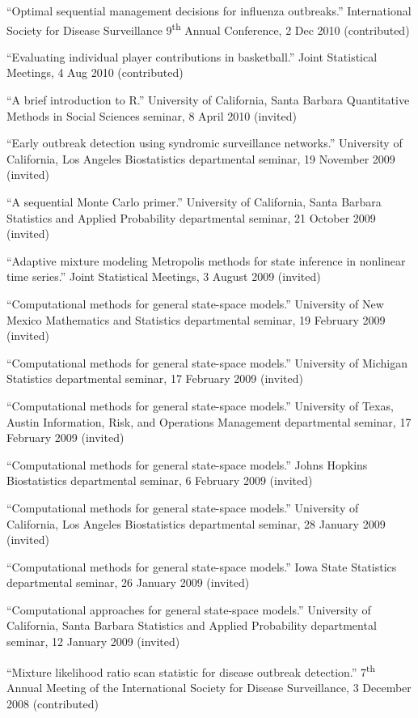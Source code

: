 \documentclass[overlapped,line,letterpaper]{res}
\begin{document}
\begin{resume}
{``Optimal sequential management decisions for influenza outbreaks.'' International Society for Disease Surveillance 9\textsuperscript{th} Annual Conference, 2 Dec 2010 (contributed)

``Evaluating individual player contributions in basketball.'' Joint Statistical Meetings, 4 Aug 2010 (contributed)

``A brief introduction to R.'' University of California, Santa Barbara Quantitative Methods in Social Sciences seminar, 8 April 2010 (invited)

``Early outbreak detection using syndromic surveillance networks.'' University of California, Los Angeles Biostatistics departmental seminar, 19 November 2009 (invited)

``A sequential Monte Carlo primer.'' University of California, Santa Barbara Statistics and Applied Probability departmental seminar, 21 October 2009 (invited)

``Adaptive mixture modeling Metropolis methods for state inference in nonlinear time series.'' Joint Statistical Meetings, 3 August 2009 (invited)

``Computational methods for general state-space models.'' University of New Mexico Mathematics and Statistics departmental seminar, 19 February 2009 (invited)

``Computational methods for general state-space models.'' University of Michigan Statistics departmental seminar, 17 February 2009 (invited)

``Computational methods for general state-space models.'' University of Texas, Austin Information, Risk, and Operations Management departmental seminar, 17 February 2009 (invited)

``Computational methods for general state-space models.'' Johns Hopkins Biostatistics departmental seminar, 6 February 2009 (invited)

``Computational methods for general state-space models.'' University of California, Los Angeles Biostatistics departmental seminar, 28 January 2009 (invited)

``Computational methods for general state-space models.'' Iowa State Statistics  departmental seminar, 26 January 2009 (invited)


``Computational approaches for general state-space models.'' University of California, Santa Barbara Statistics and Applied Probability departmental seminar, 12 January 2009 (invited)

``Mixture likelihood ratio scan statistic for disease outbreak detection.'' 7\textsuperscript{th} Annual Meeting of the International Society for Disease Surveillance, 3 December 2008 (contributed)

}
\end{resume}
\end{document}
